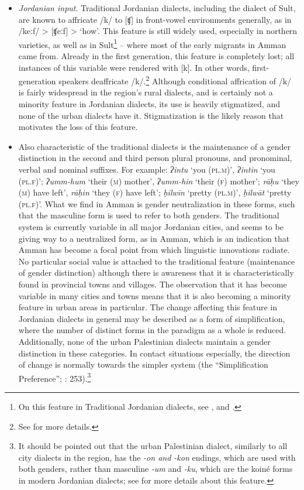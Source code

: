 \documentclass[output=paper]{langsci/langscibook}
\begin{document}
\begin{itemize}
\item[] \textit{Jordanian input}. Traditional Jordanian dialects, including the dialect of Sult, are known to affricate /k/ to [ʧ] in front-vowel environments generally, as in /keːf/ > [ʧeːf] > ‘how’. This feature is still widely used, especially in northern varieties, as well as in Sult\footnote{On this feature in Traditional Jordanian dialects, see \citet{Al-Hawamdeh2015}, \citet{Herin2010} and  \citet{HerinAl-wer2013}.} – where most of the early migrants in Amman came from. Already in the first generation, this feature is completely lost; all instances of this variable were rendered with [k]. In other words, first-generation speakers deaffricate /k/.\footnote{See \citet{Al-Wer2007} for more details.} Although conditional affrication of /k/ is fairly widespread in the region’s rural dialects, and is certainly not a minority feature in Jordanian dialects, its use is heavily stigmatized, and none of the urban dialects have it. Stigmatization is the likely reason that motivates the loss of this feature.

\item[] Also characteristic of the traditional dialects is the maintenance of a gender distinction in the second and third person plural pronouns, and pronominal, verbal and nominal suffixes. For example: \textit{ʔintu} ‘you (\textsc{pl.m})’, \textit{ʔintin} ‘you (\textsc{pl.f})’; \textit{ʔumm-hum} ‘their (\textsc{m}) mother’, \textit{ʔumm-hin} ‘their (\textsc{f}) mother’; \textit{rāḥu} ‘they (\textsc{m}) have left’, \textit{rāḥin} ‘they (\textsc{f}) have left’; \textit{ḥilwīn} ‘pretty (\textsc{pl.m})’, \textit{ḥilwāt} ‘pretty (\textsc{pl.f})'. What we find in Amman is gender neutralization in these forms, such that the masculine form is used to refer to both genders. The traditional system is currently variable in all major Jordanian cities, and seems to be giving way to a neutralized form, as in Amman, which is an indication that Amman has become a focal point from which linguistic innovations radiate. No particular social value is attached to the traditional feature (maintenance of gender distinction) although there is awareness that it is characteristically found in provincial towns and villages. The observation that it has become variable in many cities and towns means that it is also becoming a minority feature in urban areas in particular. The change affecting this feature in Jordanian dialects in general may be described as a form of simplification, where the number of distinct forms in the paradigm as a whole is reduced. Additionally, none of the urban Palestinian dialects maintain a gender distinction in these categories. In contact situations especially, the direction of change is normally towards the simpler system (the “Simplification Preference”; \citealt{Lass1997}: 253).\footnote{It should be pointed out that the urban Palestinian dialect, similarly to all city dialects in the region, has the \textit{{}-on and -kon} endings, which are used with both genders, rather than masculine \textit{{}-um} and \textit{{}-ku}, which are the koiné forms in modern Jordanian dialects; see \citet{Al-Wer2003kum} for more details about this feature.} 


\end{itemize}
\end{document}
